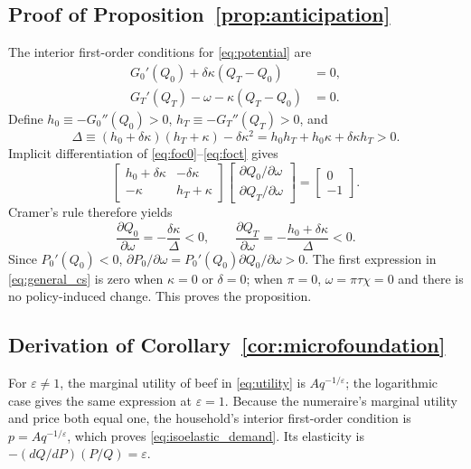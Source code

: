 \documentclass[11pt]{article}
\begin{document}
\subsection{Proof of Proposition~\ref{prop:anticipation}}
The interior first-order conditions for \eqref{eq:potential} are
\begin{align}
G_0'(Q_0)+\delta\kappa(Q_T-Q_0)&=0,\label{eq:foc0}\\
G_T'(Q_T)-\omega-\kappa(Q_T-Q_0)&=0.\label{eq:foct}
\end{align}
Define $h_0\equiv-G_0''(Q_0)>0$, $h_T\equiv-G_T''(Q_T)>0$, and
\begin{equation*}
\Delta\equiv(h_0+\delta\kappa)(h_T+\kappa)-\delta\kappa^2
=h_0h_T+h_0\kappa+\delta\kappa h_T>0.
\end{equation*}
Implicit differentiation of \eqref{eq:foc0}--\eqref{eq:foct} gives
\begin{equation*}
\begin{bmatrix}h_0+\delta\kappa&-\delta\kappa\\-\kappa&h_T+\kappa\end{bmatrix}
\begin{bmatrix}\partial Q_0/\partial\omega\\\partial Q_T/\partial\omega\end{bmatrix}
=\begin{bmatrix}0\\-1\end{bmatrix}.
\end{equation*}
Cramer's rule therefore yields
\begin{equation}\label{eq:general_cs}
\frac{\partial Q_0}{\partial\omega}=-\frac{\delta\kappa}{\Delta}<0,
\qquad
\frac{\partial Q_T}{\partial\omega}=-\frac{h_0+\delta\kappa}{\Delta}<0.
\end{equation}
Since $P_0'(Q_0)<0$, $\partial P_0/\partial\omega=P_0'(Q_0)\partial Q_0/\partial\omega>0$. The first expression in \eqref{eq:general_cs} is zero when $\kappa=0$ or $\delta=0$; when $\pi=0$, $\omega=\pi\tau\chi=0$ and there is no policy-induced change. This proves the proposition.

\subsection{Derivation of Corollary~\ref{cor:microfoundation}}
For $\varepsilon\neq1$, the marginal utility of beef in \eqref{eq:utility} is $Aq^{-1/\varepsilon}$; the logarithmic case gives the same expression at $\varepsilon=1$. Because the numeraire's marginal utility and price both equal one, the household's interior first-order condition is $p=Aq^{-1/\varepsilon}$, which proves \eqref{eq:isoelastic_demand}. Its elasticity is $-(dQ/dP)(P/Q)=\varepsilon$.
\end{document}
